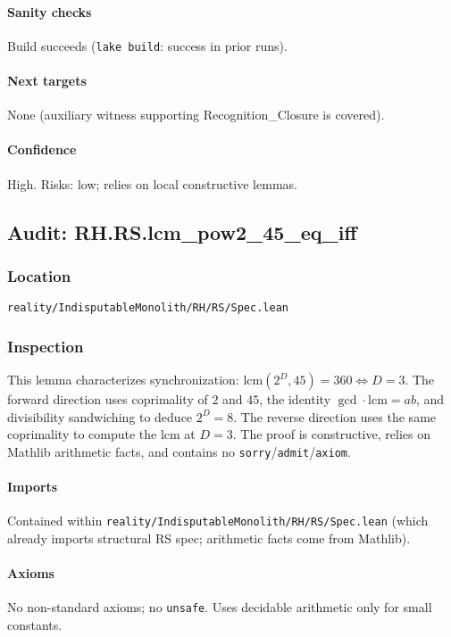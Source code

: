 \documentclass{article}
\newcommand{\FileRef}[1]{\texttt{#1}}
\begin{document}
\paragraph{Sanity checks}
Build succeeds (\texttt{lake build}: success in prior runs).

\paragraph{Next targets}
None (auxiliary witness supporting Recognition\_Closure is covered).

\paragraph{Confidence} High. Risks: low; relies on local constructive lemmas.

\subsection{Audit: RH.RS.lcm\_pow2\_45\_eq\_iff}
\subsubsection{Location}
\FileRef{reality/IndisputableMonolith/RH/RS/Spec.lean}

\subsubsection{Inspection}
This lemma characterizes synchronization: \(\mathrm{lcm}(2^D,45)=360 \iff D=3\). The forward direction uses coprimality of \(2\) and \(45\), the identity \(\gcd\cdot\mathrm{lcm}=ab\), and divisibility sandwiching to deduce \(2^D=8\). The reverse direction uses the same coprimality to compute the lcm at \(D=3\). The proof is constructive, relies on Mathlib arithmetic facts, and contains no \texttt{sorry}/\texttt{admit}/\texttt{axiom}.

\paragraph{Imports}
Contained within \FileRef{reality/IndisputableMonolith/RH/RS/Spec.lean} (which already imports structural RS spec; arithmetic facts come from Mathlib).

\paragraph{Axioms}
No non-standard axioms; no \texttt{unsafe}. Uses decidable arithmetic only for small constants.
\end{document}
